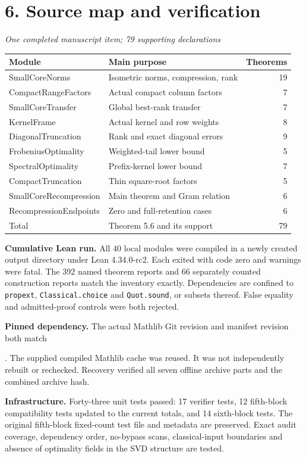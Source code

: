 \documentclass[11pt]{article}
\newcommand{\pageheading}[2]{\section*{\color{ink}#1}\textit{#2}\par}
\begin{document}
\newpage
\pageheading{6. Source map and verification}{One completed manuscript item; 79 supporting declarations}
\begin{center}\small
\renewcommand{\arraystretch}{1.18}
\begin{tabular}{@{}p{}p{}r@{}}
\toprule
Module & Main purpose & Theorems\\
\midrule
SmallCoreNorms & Isometric norms, compression, rank & 19\\
CompactRangeFactors & Actual compact column factors & 7\\
SmallCoreTransfer & Global best-rank transfer & 7\\
KernelFrame & Actual kernel and row weights & 8\\
DiagonalTruncation & Rank and exact diagonal errors & 9\\
FrobeniusOptimality & Weighted-tail lower bound & 5\\
SpectralOptimality & Prefix-kernel lower bound & 7\\
CompactTruncation & Thin square-root factors & 5\\
SmallCoreRecompression & Main theorem and Gram relation & 6\\
RecompressionEndpoints & Zero and full-retention cases & 6\\
\midrule
Total & Theorem 5.6 and its support & 79\\
\bottomrule
\end{tabular}
\end{center}

\textbf{Cumulative Lean run.} All 40 local modules were compiled in a newly created output directory under Lean 4.34.0-rc2. Each exited with code zero and warnings were fatal. The 392 named theorem reports and 66 separately counted construction reports match the inventory exactly. Dependencies are confined to \texttt{propext}, \texttt{Classical.choice} and \texttt{Quot.sound}, or subsets thereof. False equality and admitted-proof controls were both rejected.

\textbf{Pinned dependency.} The actual Mathlib Git revision and manifest revision both match\par
{}.
The supplied compiled Mathlib cache was reused. It was not independently rebuilt or rechecked. Recovery verified all seven offline archive parts and the combined archive hash.

\textbf{Infrastructure.} Forty-three unit tests passed: 17 verifier tests, 12 fifth-block compatibility tests updated to the current totals, and 14 sixth-block tests. The original fifth-block fixed-count test file and metadata are preserved. Exact audit coverage, dependency order, no-bypass scans, classical-input boundaries and absence of optimality fields in the SVD structure are tested.
\end{document}
